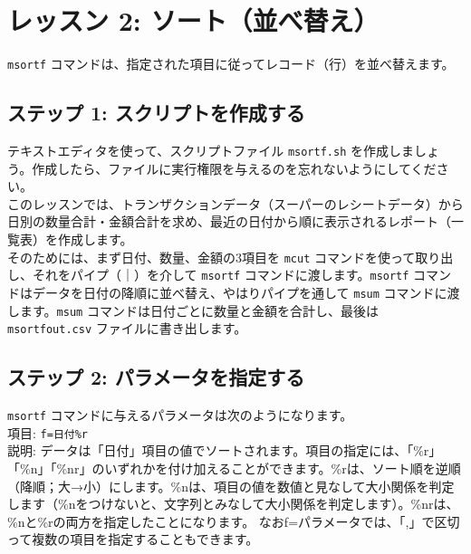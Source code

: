 

%


\section{レッスン 2: ソート（並べ替え）}

\verb|msortf| コマンドは、指定された項目に従ってレコード（行）を並べ替えます。


\subsection{ステップ 1: スクリプトを作成する}

テキストエディタを使って、スクリプトファイル \verb|msortf.sh| を作成しましょう。作成したら、ファイルに実行権限を与えるのを忘れないようにしてください。\\

このレッスンでは、トランザクションデータ（スーパーのレシートデータ）から日別の数量合計・金額合計を求め、最近の日付から順に表示されるレポート（一覧表）を作成します。\\

そのためには、まず日付、数量、金額の3項目を \verb|mcut| コマンドを使って取り出し、それをパイプ（｜）を介して \verb|msortf| コマンドに渡します。\verb|msortf| コマンドはデータを日付の降順に並べ替え、やはりパイプを通して \verb|msum| コマンドに渡します。\verb|msum| コマンドは日付ごとに数量と金額を合計し、最後は \verb|msortfout.csv| ファイルに書き出します。\\

 \subsection{ステップ 2: パラメータを指定する}

{\setlength{\parindent}{0cm}

\verb|msortf| コマンドに与えるパラメータは次のようになります。\\

項目: 		\verb|f=日付%r| \\
説明: データは「日付」項目の値でソートされます。項目の指定には、「\%r」「\%n」「\%nr」のいずれかを付け加えることができます。\%rは、ソート順を逆順（降順；大→小）にします。\%nは、項目の値を数値と見なして大小関係を判定します（\%nをつけないと、文字列とみなして大小関係を判定します）。\%nrは、\%nと\%rの両方を指定したことになります。
なおf=パラメータでは、「,」で区切って複数の項目を指定することもできます。} \\

